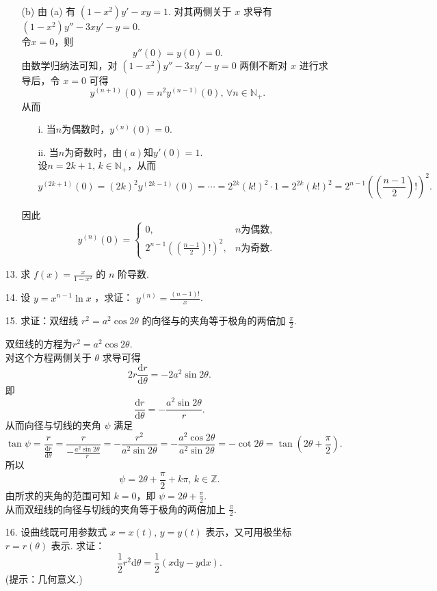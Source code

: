 \begin{enumerate}
\begin{solution}
\begin{enumerate}
        \item[(b)] 
        由 (a) 有 $(1-x^2)y'-xy=1$.
        对其两侧关于 $x$ 求导有 $(1-x^2)y''-3xy'-y=0$.\\
        令$x=0$，则
        \[
        y''(0)=y(0)=0.
        \]
        由数学归纳法可知，对 $(1-x^2)y''-3xy'-y=0$ 两侧不断对 $x$ 进行求导后，令 $x=0$ 可得
        \[
        y^{(n+1)}(0)=n^2y^{(n-1)}(0),\,\forall n\in\mathbb{N}_{+}.
        \]
        从而
        \begin{enumerate}
        \item[i.] 当$n$为偶数时，$y^{(n)}(0)=0$.
        \item[ii.] 当$n$为奇数时，由$(a)$知$y'(0)=1$.\\
        设$n=2k+1,\,k\in\mathbb{N}_{+}$，从而
        \[
        y^{(2k+1)}(0)=(2k)^2y^{(2k-1)}(0)=\cdots=2^{2k}(k!)^2\cdot 1=2^{2k}(k!)^2=2^{n-1}\left(\left(\frac{n-1}{2}\right)!\right)^2.
        \] 
        \end{enumerate}
        因此
        \[
        y^{(n)}(0)=
        \begin{cases}
            0, & n \text{为偶数},\\
            2^{n-1}\left(\left(\frac{n-1}{2}\right)!\right)^2, & n \text{为奇数}.
        \end{cases}\]
        \end{enumerate}
    \end{solution}

    \item[13.]求 $\displaystyle f(x) = \frac{x}{1 - x^{2}}$ 的 $n$ 阶导数.
    \item[14.]设 $\displaystyle y = x^{n - 1}\ln x$ ，求证： $\displaystyle y^{(n)} = \frac{(n - 1)!}{x}$.
    \item[15.]求证：双纽线 $\displaystyle r^{2} = a^{2}\cos 2\theta$ 的向径与的夹角等于极角的两倍加 $\displaystyle \frac{\pi}{2}$.
    \begin{solution}
        双纽线的方程为$r^2=a^2\cos 2\theta$.\\
        对这个方程两侧关于 $\theta$ 求导可得
        \[
        2r\frac{\mathrm{d}r}{\mathrm{d}\theta}=-2a^2\sin{2\theta}.
        \]
        即
        \[
        \frac{\mathrm{d}r}{\mathrm{d}\theta}=-\frac{a^2\sin 2\theta}{r}.
        \]
        从而向径与切线的夹角 $\psi$ 满足
        \[
        \tan\psi=\frac{r}{\frac{\mathrm{d}r}{\mathrm{d}\theta}}=\frac{r}{-\frac{a^2\sin 2\theta}{r}}=-\frac{r^2}{a^2\sin 2\theta}=-\frac{a^2\cos{2\theta}}{a^2\sin{2\theta}}=-\cot{2\theta}=\tan(2\theta+\frac{\pi}{2}).
        \]
        所以
        \[
        \psi=2\theta+\frac{\pi}{2}+k\pi,\,k\in\mathbb{Z}.
        \]
        由所求的夹角的范围可知 $k=0$，即 $\psi=2\theta+\frac{\pi}{2}$.\\
        从而双纽线的向径与切线的夹角等于极角的两倍加上 $\frac{\pi}{2}$.
    \end{solution}
    \item[16.]设曲线既可用参数式 $\displaystyle x=x(t),\,y=y(t)$ 表示，又可用极坐标 $r=r(\theta)$ 表示. 求证：
    \[
        \frac{1}{2}r^2\mathrm{d}\theta=\frac{1}{2}(x\mathrm{d}y-y\mathrm{d}x).
    \] 
    (提示：几何意义.)
\end{enumerate}

